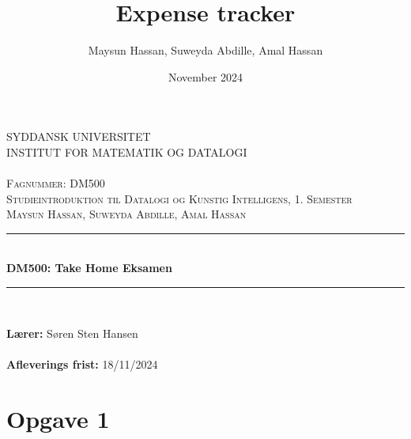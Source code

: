 \documentclass{article}
\title{Expense tracker}
\author{Maysun Hassan, Suweyda Abdille, Amal Hassan}
\date{November 2024}
\begin{document}
\begin{titlepage}
        \begin{center}
        \textsc{\LARGE SYDDANSK UNIVERSITET}\\[0.3cm]
                \textsc{\Large INSTITUT FOR MATEMATIK OG DATALOGI}\\[0.3cm]
                \textsc{\large }\\[1.2cm]

   
      \vspace{0.5cm}
        \textsc{\large{Fagnummer: DM500}}\\[0.5cm]
        \textsc{\large{Studieintroduktion til Datalogi og Kunstig Intelligens, 1. Semester}}\\[0.5cm]
        \textsc{\large{Maysun Hassan, Suweyda Abdille, Amal Hassan}}\\[0.5cm]
        \rule{\linewidth}{0.5mm}\\[0.4cm]
        { \LARGE \bfseries  DM500: Take Home Eksamen \\[0.4cm]}
        \rule{\linewidth}{0.5mm}\\[1.5cm]
         
       
        \vspace{1.5cm}

       
        \textbf{Lærer:} Søren Sten Hansen \\ \mbox{}\\
        \textbf{Afleverings frist:} 18/11/2024
       
       \end{center}
       

\clearpage
   \end{titlepage}

\section*{Opgave 1}
\end{document}
